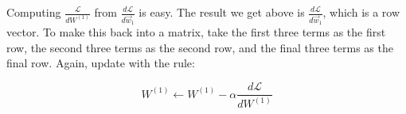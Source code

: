 \documentclass{article}
\begin{document}
Computing $\frac{\mathcal{L}}{d W^{(1)}}$ from $\frac{d\mathcal{L}}{d \vec{w}_1}$ is easy. The result we get above is $\frac{d\mathcal{L}}{d \vec{w}_1}$, which is a row vector. To make this back into a matrix, take the first three terms as the first row, the second three terms as the second row, and the final three terms as the final row. Again, update with the rule:

\[W^{(1)} \xleftarrow{} W^{(1)} - \alpha \frac{d\mathcal{L}}{d W^{(1)}}\]

\end{document}
